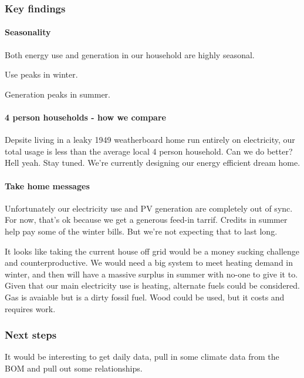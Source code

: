 \documentclass[]{article}
\let\oldparagraph\paragraph
\renewcommand{\paragraph}[1]{\oldparagraph{#1}\mbox{}}
\begin{document}
\subsubsection{Key findings}\label{key-findings}

\paragraph{Seasonality}\label{seasonality}

Both energy use and generation in our household are highly seasonal.

Use peaks in winter.

Generation peaks in summer.

\paragraph{4 person households - how we
compare}\label{person-households---how-we-compare}

Depsite living in a leaky 1949 weatherboard home run entirely on
electricity, our total usage is less than the average local 4 person
household. Can we do better? Hell yeah. Stay tuned. We're currently
designing our energy efficient dream home.

\paragraph{Take home messages}\label{take-home-messages}

Unfortunately our electricity use and PV generation are completely out
of sync. For now, that's ok because we get a generous feed-in tarrif.
Credits in summer help pay some of the winter bills. But we're not
expecting that to last long.

It looks like taking the current house off grid would be a money sucking
challenge and counterproductive. We would need a big system to meet
heating demand in winter, and then will have a massive surplus in summer
with no-one to give it to. Given that our main electricity use is
heating, alternate fuels could be considered. Gas is avaiable but is a
dirty fossil fuel. Wood could be used, but it costs and requires work.

\subsubsection{Next steps}\label{next-steps}

It would be interesting to get daily data, pull in some climate data
from the BOM and pull out some relationships.
\end{document}

